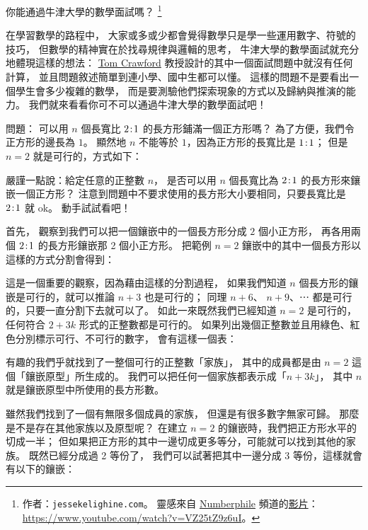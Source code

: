 \documentclass{article}
\begin{document}
\centerline{%
	\large\textsf{你能通過牛津大學的數學面試嗎？}%
	\footnote{%
		作者：\texttt{jessekelighine.com}。
		靈感來自
		\href{https://www.youtube.com/channel/UCoxcjq-8xIDTYp3uz647V5A}{Numberphile}
		頻道的\href{https://www.youtube.com/watch?v=VZ25tZ9z6uI}{影片}：
		\url{https://www.youtube.com/watch?v=VZ25tZ9z6uI}。
	}
}

\begin{multicols*}{2}

在學習數學的路程中，
大家或多或少都會覺得數學只是學一些運用數字、符號的技巧，
但數學的精神實在於找尋規律與邏輯的思考，
牛津大學的數學面試就充分地體現這樣的想法：
\href{https://www.seh.ox.ac.uk/people/tom-crawford}{Tom Crawford}
教授設計的其中一個面試問題中就沒有任何計算，
並且問題敘述簡單到連小學、國中生都可以懂。
這樣的問題不是要看出一個學生會多少複雜的數學，
而是要測驗他們探索現象的方式以及歸納與推演的能力。
我們就來看看你可不可以通過牛津大學的數學面試吧！

\textsf{問題}：
可以用 $n$ 個長寬比 $2\!:\!1$ 的長方形鋪滿一個正方形嗎？
為了方便，我們令正方形的邊長為 $1$。
顯然地 $n$ 不能等於 $1$，因為正方形的長寬比是 $1\!:\!1$；
但是 $n=2$ 就是可行的，方式如下：


\noindent
嚴謹一點說：給定任意的正整數 $n$，
是否可以用 $n$ 個長寬比為 $2\!:\!1$ 的長方形來鑲嵌一個正方形？
注意到問題中不要求使用的長方形大小要相同，只要長寬比是 $2\!:\!1$ 就 ok。
動手試試看吧！

\separationline

首先，
觀察到我們可以把一個鑲嵌中的一個長方形分成 $2$ 個小正方形，
再各用兩個 $2\!:\!1$ 的長方形鑲嵌那 2 個小正方形。
把範例 $n=2$ 鑲嵌中的其中一個長方形以這樣的方式分割會得到：


\noindent
這是一個重要的觀察，因為藉由這樣的分割過程，
如果我們知道 $n$ 個長方形的鑲嵌是可行的，就可以推論 $n+3$ 也是可行的；
同理 $n+6$、 $n+9$、⋯ 都是可行的，只要一直分割下去就可以了。
如此一來既然我們已經知道 $n=2$ 是可行的，
任何符合 $2+3k$ 形式的正整數都是可行的。
如果列出幾個正整數並且用綠色、紅色分別標示可行、不可行的數字，
會有這樣一個表：


\noindent
有趣的我們乎就找到了一整個可行的正整數「家族」，
其中的成員都是由 $n=2$ 這個「鑲嵌原型」所生成的。
我們可以把任何一個家族都表示成「$n+3k$」，
其中 $n$ 就是鑲嵌原型中所使用的長方形數。

雖然我們找到了一個有無限多個成員的家族，
但還是有很多數字無家可歸。
那麼是不是存在其他家族以及原型呢？
在建立 $n=2$ 的鑲嵌時，我們把正方形水平的切成一半；
但如果把正方形的其中一邊切成更多等分，可能就可以找到其他的家族。
既然已經分成過 2 等份了，
我們可以試著把其中一邊分成 3 等份，這樣就會有以下的鑲嵌：


\end{multicols*}
\end{document}
